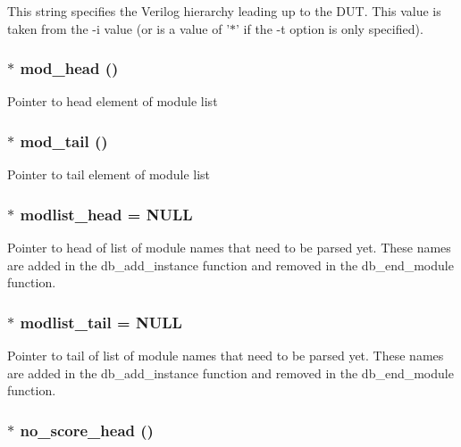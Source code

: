 This string specifies the Verilog hierarchy leading up to the DUT. This value is taken from the -i value (or is a value of '$\ast$' if the -t option is only specified). 
\subsubsection{$\ast$ {\bf mod\_\-head} ()}\label{db_8c_a3}


Pointer to head element of module list 
\subsubsection{$\ast$ {\bf mod\_\-tail} ()}\label{db_8c_a4}


Pointer to tail element of module list 
\subsubsection{$\ast$ {\bf modlist\_\-head} = NULL}\label{db_8c_a14}


Pointer to head of list of module names that need to be parsed yet. These names are added in the db\_\-add\_\-instance function and removed in the db\_\-end\_\-module function. 
\subsubsection{$\ast$ {\bf modlist\_\-tail} = NULL}\label{db_8c_a15}


Pointer to tail of list of module names that need to be parsed yet. These names are added in the db\_\-add\_\-instance function and removed in the db\_\-end\_\-module function. 
\subsubsection{$\ast$ {\bf no\_\-score\_\-head} ()}\label{db_8c_a2}


